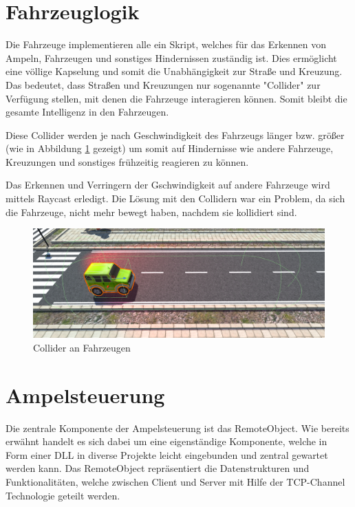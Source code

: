 \section{Fahrzeuglogik}
\label{Fahrzeuglogik}

Die Fahrzeuge implementieren alle ein Skript, welches für das Erkennen von Ampeln, Fahrzeugen und sonstiges Hindernissen zuständig ist. Dies ermöglicht eine völlige Kapselung und somit die Unabhängigkeit zur Straße und Kreuzung. Das bedeutet, dass Straßen und Kreuzungen nur sogenannte "Collider" zur Verfügung stellen, mit denen die Fahrzeuge interagieren können. Somit bleibt die gesamte Intelligenz in den Fahrzeugen.

Diese Collider werden je nach Geschwindigkeit des Fahrzeugs länger bzw. größer (wie in Abbildung \ref{img:car_collider} gezeigt) um somit auf Hindernisse wie andere Fahrzeuge, Kreuzungen und sonstiges frühzeitig reagieren zu können.

Das Erkennen und Verringern der Gschwindigkeit auf andere Fahrzeuge wird mittels Raycast erledigt. Die Lösung mit den Collidern war ein Problem, da sich die Fahrzeuge, nicht mehr bewegt haben, nachdem sie kollidiert sind.

\begin{figure}[H]
\begin{center}
	\includegraphics[width=1\textwidth]{BilderAllgemein/Jeep_Collider.png}
\end{center}
	\caption{Collider an Fahrzeugen}
	\label{img:car_collider}
\end{figure}


\section{Ampelsteuerung}

Die zentrale Komponente der Ampelsteuerung ist das RemoteObject. Wie bereits erwähnt handelt es sich dabei um eine eigenständige Komponente, welche in Form einer DLL in diverse Projekte leicht eingebunden und zentral gewartet werden kann. Das RemoteObject repräsentiert die Datenstrukturen und Funktionalitäten, welche zwischen Client und Server mit Hilfe der TCP-Channel Technologie geteilt werden.

